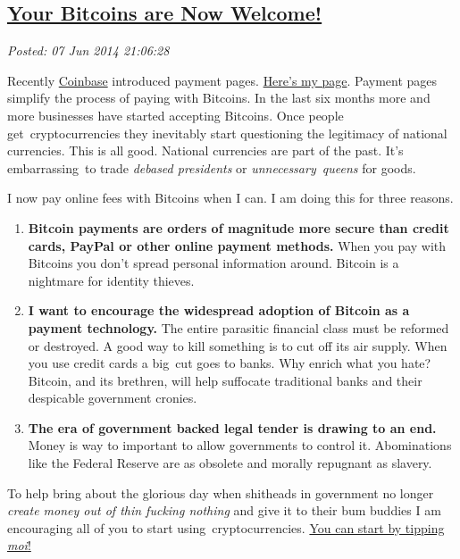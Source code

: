 %

\subsection*{\href{https://bakerjd99.wordpress.com/2014/06/07/your-bitcoins-are-now-welcome/}{Your Bitcoins are Now Welcome!}}


\noindent\emph{Posted: 07 Jun 2014 21:06:28}
\vspace{6pt}

Recently \href{https://coinbase.com/}{Coinbase} introduced payment
pages. \href{https://coinbase.com/bakerjd99}{Here's my page}. Payment
pages simplify the process of paying with Bitcoins. In the last six
months more and more businesses have started accepting Bitcoins. Once
people get~cryptocurrencies they inevitably start questioning the
legitimacy of national currencies. This is all good. National currencies
are part of the past. It's embarrassing~to trade \emph{debased
presidents} or \emph{unnecessary~queens} for goods.

I now pay online fees with Bitcoins when I can. I am doing this for
three reasons.

\begin{enumerate}
\item
  \textbf{Bitcoin payments are orders of magnitude more secure than
  credit cards, PayPal or other online payment methods.} When you pay
  with Bitcoins you don't spread personal information around. Bitcoin is
  a nightmare for identity thieves.
\item
  \textbf{I want to encourage the widespread adoption of Bitcoin as a
  payment technology.} The entire parasitic financial class must be
  reformed or destroyed. A good way to kill something is to cut off its
  air supply. When you use credit cards a big~cut goes
  to banks. Why enrich what you hate? Bitcoin, and its brethren, will
  help suffocate traditional banks and their despicable government
  cronies.
\item
  \textbf{The era of government backed legal tender is drawing to an
  end.} Money is way to important to allow governments to control it.
  Abominations like the Federal Reserve are as obsolete and morally
  repugnant as slavery.
\end{enumerate}

To help bring about the glorious day when shitheads in government no
longer \emph{create money out of thin fucking nothing} and give it to their
bum buddies I am encouraging all of you to start using~cryptocurrencies.
\href{https://coinbase.com/bakerjd99}{You can start by
tipping \emph{moi}!}



%